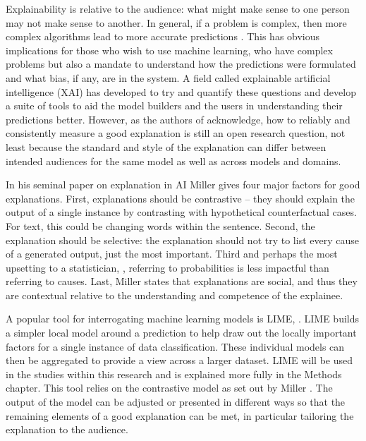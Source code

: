 Explainability is relative to the audience: what might make sense to one person may not make sense to another. In general, if a problem is complex, then more complex algorithms lead to more accurate predictions  \parencite{arrieta2020explainable}. This has obvious implications for those who wish to use machine learning, who have complex problems but also a mandate to understand how the predictions were formulated and what bias, if any, are in the system. A field called explainable artificial intelligence (XAI)  \parencite{gunning2019xai} has developed to try and quantify these questions and develop a suite of tools to aid the model builders and the users in understanding their predictions better. However, as the authors of  \parencite{gunning2019xai}  acknowledge, how to reliably and consistently measure a good explanation is still an open research question, not least because the standard and style of the explanation can differ between intended audiences for the same model as well as across models and domains.

In his seminal paper on explanation in AI \parencite{miller2019explanation} Miller gives four major factors for good explanations. First, explanations should be contrastive – they should explain the output of a single instance by contrasting with hypothetical counterfactual cases. For text, this could be changing words within the sentence. Second, the explanation should be selective: the explanation should not try to list every cause of a generated output, just the most important. Third and perhaps the most upsetting to a statistician,   , referring to probabilities is less impactful than referring to causes. Last, Miller states that explanations are social, and thus they are contextual relative to the understanding and competence of the explainee.

A popular tool  for interrogating machine learning models is LIME, \parencite{ribeiro2016should}. LIME  builds a simpler local model around a prediction to help draw out the locally important factors for a single instance of data classification. These individual models can then be aggregated to provide a view across a larger dataset.  LIME will be used in the studies within this research and is explained more fully in the Methods chapter. This tool relies on the contrastive model as set out by Miller \parencite{miller2019explanation}. The output of the model can be adjusted or presented in different ways so that the remaining elements of a good explanation can be met, in particular tailoring the explanation to the audience.

